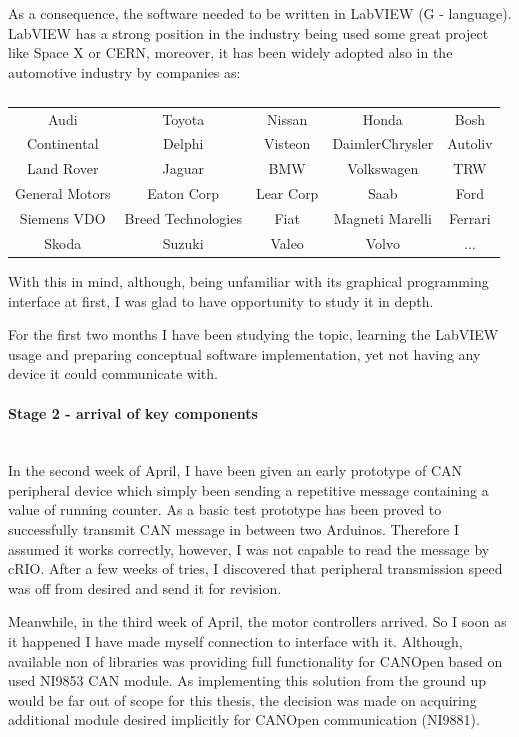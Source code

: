 As a consequence, the software needed to be written in LabVIEW (G - language). LabVIEW has a strong position in the industry being used some great project like Space X or CERN, moreover, it has been widely adopted also in the automotive industry by companies as:
\begin{table}[H]
    \centering
    \begin{tabular}{c|c|c|c|c}
        Audi & Toyota & Nissan & Honda & Bosh \\ 
        Continental & Delphi & Visteon & DaimlerChrysler & Autoliv \\
        Land Rover & Jaguar & BMW & Volkswagen & TRW \\
        General Motors & Eaton Corp & Lear Corp & Saab & Ford \\
        Siemens VDO & Breed Technologies & Fiat & Magneti Marelli & Ferrari \\
        Skoda & Suzuki & Valeo & Volvo & ...
    \end{tabular}
    \caption*{\cite{LabVIEW_adoption}}
    \label{tab:LabVIEW_adoption}
\end{table}
With this in mind, although, being unfamiliar with its graphical programming interface at first, I was glad to have opportunity to study it in depth.

For the first two months I have been studying the topic, learning the LabVIEW usage and preparing conceptual software implementation, yet not having any device it could communicate with.

\paragraph{Stage 2 - arrival of key components}   
\addtocounter{section}{1}
\mbox{}\\
In the second week of April, I have been given an early prototype of CAN peripheral device which simply been sending a repetitive message containing a value of running counter. As a basic test prototype has been proved to successfully transmit CAN message in between two Arduinos. Therefore I assumed it works correctly, however, I was not capable to read the message by cRIO. After a few weeks of tries, I discovered that peripheral transmission speed was off from desired and send it for revision.

Meanwhile, in the third week of April, the motor controllers arrived. So I soon as it happened I have made myself connection to interface with it. Although, available non of libraries was providing full functionality for CANOpen based on used NI9853 CAN module. As implementing this solution from the ground up would be far out of scope for this thesis, the decision was made on acquiring additional module desired implicitly for CANOpen communication (NI9881).

